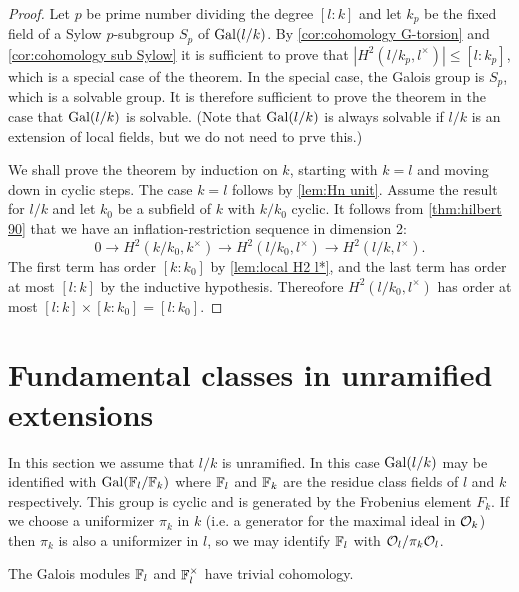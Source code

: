 \begin{proof}
	Let $p$ be prime number dividing the degree $[l:k]$ and let $k_p$ be the fixed field
	of a Sylow $p$-subgroup $S_p$ of $\mathrm{Gal}(l/k)$.
	By \ref{cor:cohomology G-torsion} and \ref{cor:cohomology sub Sylow}
	it is sufficient to prove that $|H^2(l/k_p,l^\times)| \le [l:k_p]$,
	which is a special case of the theorem.
	In the special case, the Galois group is $S_p$, which is a solvable group.
	It is therefore sufficient to prove the theorem in the case that $\mathrm{Gal}(l/k)$ is solvable.
	(Note that $\mathrm{Gal}(l/k)$ is always solvable if $l/k$ is an extension of local fields,
	but we do not need to prve this.)

	We shall prove the theorem by induction on $k$, starting with $k=l$ and moving down in
	cyclic steps.
	The case $k=l$ follows by \ref{lem:Hn unit}.
	Assume the result for $l/k$ and let $k_0$ be a subfield of $k$ with $k/k_0$ cyclic.
	It follows from \ref{thm:hilbert 90} that
	we have an inflation-restriction sequence in dimension 2:
	\[
		0 \to H^2(k/k_0, k^\times) \to H^2( l/k_0, l^\times) \to H^2(l/k, l^\times).
	\]
	The first term has order $[k : k_0]$ by \ref{lem:local H2 l*}, and the last term has
	order at most $[l:k]$ by the inductive hypothesis.
	Thereofore $H^2( l/k_0, l^\times)$ has order at most $[l:k] \times [k : k_0] = [l: k_0]$.
\end{proof}







\section{Fundamental classes in unramified extensions}

In this section we assume that $l/k$ is unramified.
In this case $\mathrm{Gal}(l/k)$ may be identified with $\mathrm{Gal}({\mathbb F}_l / {\mathbb F}_k)$ where
${\mathbb F}_l$ and ${\mathbb F}_k$ are the residue class fields of $l$ and $k$ respectively.
This group is cyclic and is generated by the Frobenius element $F_k$.
If we choose a uniformizer $\pi_k$ in $k$ (i.e. a generator for the maximal ideal in ${\mathcal O}_k$)
then $\pi_k$ is also a uniformizer in $l$, so we may identify ${\mathbb F}_l$ with ${\mathcal O}_l / \pi_k {\mathcal O}_l$.

\begin{lemma} \label{lem:finite field trivial}
	The Galois modules ${\mathbb F}_l$ and ${\mathbb F}_l^\times$ have trivial cohomology.
\end{lemma}


